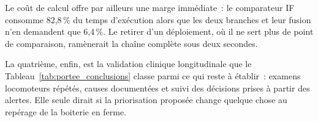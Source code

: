 Le coût de calcul offre par ailleurs une marge immédiate~: le comparateur IF consomme
82,8\,\% du temps d'exécution alors que les deux branches et leur fusion n'en demandent que
6,4\,\%. Le retirer d'un déploiement, où il ne sert plus de point de comparaison, ramènerait
la chaîne complète sous deux secondes.

La quatrième, enfin, est la validation clinique longitudinale que le
Tableau~\ref{tab:portee_conclusions} classe parmi ce qui reste à établir~: examens locomoteurs
répétés, causes documentées et suivi des décisions prises à partir des alertes. Elle seule
dirait si la priorisation proposée change quelque chose au repérage de la boiterie en ferme.

\renewcommand{\thetable}{{\thechapter.\arabic{table}}}

\setcounter{secnumdepth}{5}

\makeatletter
\renewcommand\section{\@startsection{section}{1}{\z@}%
  {12bp\@plus.2ex\@minus.2ex}{0.01bp\@plus.2ex}%
  {\normalfont\normalsize\baselineskip=\simpleinter}}
\makeatother
